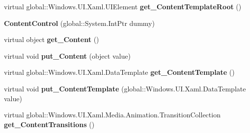 \begin{DoxyCompactItemize}
\item 
\mbox{\label{class_windows_1_1_u_i_1_1_xaml_1_1_controls_1_1_content_control_a1b8d96eef56757cec1eb123b64b62fe4}} 
virtual global\+::\+Windows.\+U\+I.\+Xaml.\+U\+I\+Element {\bfseries get\+\_\+\+Content\+Template\+Root} ()
\item 
\mbox{\label{class_windows_1_1_u_i_1_1_xaml_1_1_controls_1_1_content_control_a54ac07e93dd29c05ab129eb11a433a57}} 
{\bfseries Content\+Control} (global\+::\+System.\+Int\+Ptr dummy)
\item 
\mbox{\label{class_windows_1_1_u_i_1_1_xaml_1_1_controls_1_1_content_control_a1398a502667d7adf98f72f4ae5c485c9}} 
virtual object {\bfseries get\+\_\+\+Content} ()
\item 
\mbox{\label{class_windows_1_1_u_i_1_1_xaml_1_1_controls_1_1_content_control_ac840a1532f5f739ccb323a723b58454b}} 
virtual void {\bfseries put\+\_\+\+Content} (object value)
\item 
\mbox{\label{class_windows_1_1_u_i_1_1_xaml_1_1_controls_1_1_content_control_a5cc3b93bc15a1c9c0ed277ec8dc6dfe9}} 
virtual global\+::\+Windows.\+U\+I.\+Xaml.\+Data\+Template {\bfseries get\+\_\+\+Content\+Template} ()
\item 
\mbox{\label{class_windows_1_1_u_i_1_1_xaml_1_1_controls_1_1_content_control_ab0e5c4f7859f68ed01991a8e932e4bda}} 
virtual void {\bfseries put\+\_\+\+Content\+Template} (global\+::\+Windows.\+U\+I.\+Xaml.\+Data\+Template value)
\item 
\mbox{\label{class_windows_1_1_u_i_1_1_xaml_1_1_controls_1_1_content_control_a074c0bbf88ba02121501aea5d840d64f}} 
virtual global\+::\+Windows.\+U\+I.\+Xaml.\+Media.\+Animation.\+Transition\+Collection {\bfseries get\+\_\+\+Content\+Transitions} ()
\item 
\mbox{\label{class_windows_1_1_u_i_1_1_xaml_1_1_controls_1_1_content_control_aa5fc9bac28b70e7fe86efcb229e8c57d}} 

\end{DoxyCompactItemize}
